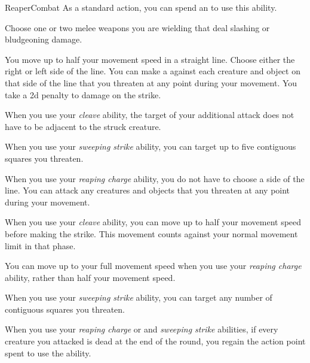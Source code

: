 \begin{feat}{Reaper}{Combat}
         As a standard action, you can spend an  to use this ability.
        \begin{ability}
            \begin{spelltargetinginfo}
                \spellspecial Choose one or two melee weapons you are wielding that deal slashing or bludgeoning damage.
            \end{spelltargetinginfo}
            \begin{spelleffects}
                \spelleffect You move up to half your movement speed in a straight line.
                Choose either the right or left side of the line.
                You can make a  against each creature and object on that side of the line that you threaten at any point during your movement.
                You take a \minus2d penalty to damage on the strike.
            \end{spelleffects}
        \end{ability}

         When you use your \textit{cleave} ability, the target of your additional attack does not have to be adjacent to the struck creature.

         When you use your \textit{sweeping strike} ability, you can target up to five contiguous squares you threaten.

         When you use your \textit{reaping charge} ability, you do not have to choose a side of the line.
        You can attack any creatures and objects that you threaten at any point during your movement.

         When you use your \textit{cleave} ability, you can move up to half your movement speed before making the strike.
        This movement counts against your normal movement limit in that phase.

         You can move up to your full movement speed when you use your \textit{reaping charge} ability, rather than half your movement speed.

         When you use your \textit{sweeping strike} ability, you can target any number of contiguous squares you threaten.

         When you use your \textit{reaping charge} or and \textit{sweeping strike} abilities, if every creature you attacked is dead at the end of the round, you regain the action point spent to use the ability.
    \end{feat}

